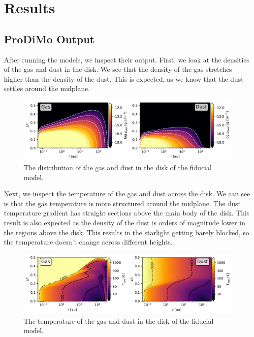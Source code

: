 \documentclass[twoside, single, authoryear, semicolon]{lion-msc}
\newcommand{\3}{$_3$}
\newcommand{\2}{$_2$}
\begin{document}
\chapter{Results}
\section{ProDiMo Output}
After running the models, we inspect their output. First, we look at the densities of the gas and dust in the disk. We see that the density of the gas stretches higher than the density of the dust. This is expected, as we know that the dust settles around the midplane. 

\begin{figure}[!ht]
    \centering
    \includegraphics[width=\linewidth]{Figures/Density.pdf}
    \caption{The distribution of the gas and dust in the disk of the fiducial model.}
    \label{fig:density}
\end{figure}

Next, we inspect the temperature of the gas and dust across the disk. We can see is that the gas temperature is more structured around the midplane. The dust temperature gradient has straight sections above the main body of the disk. This result is also expected as the density of the dust is orders of magnitude lower in the regions above the disk. This results in the starlight getting barely blocked, so the temperature doesn't change across different heights.

\begin{figure}[!ht]
    \centering
    \includegraphics[width=\linewidth]{Figures/Temperature.pdf}
    \caption{The temperature of the gas and dust in the disk of the fiducial model.}
    \label{fig:temperature}
\end{figure}
\end{document}
